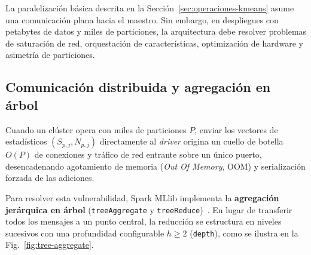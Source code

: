 \documentclass[conference,a4paper]{IEEEtran}
\begin{document}
La paralelización básica descrita en la Sección~\ref{sec:operaciones-kmeans} asume una comunicación plana hacia el maestro. Sin embargo, en despliegues con petabytes de datos y miles de particiones, la arquitectura debe resolver problemas de saturación de red, orquestación de características, optimización de hardware y asimetría de particiones.

\subsection{Comunicación distribuida y agregación en árbol}

Cuando un clúster opera con miles de particiones $P$, enviar los vectores de estadísticos $(S_{p,j}, N_{p,j})$ directamente al \textit{driver} origina un cuello de botella $O(P)$ de conexiones y tráfico de red entrante sobre un único puerto, desencadenando agotamiento de memoria (\textit{Out Of Memory}, OOM) y serialización forzada de las adiciones.

Para resolver esta vulnerabilidad, Spark MLlib implementa la \textbf{agregación jerárquica en árbol} (\texttt{treeAggregate} y \texttt{treeReduce})~\cite{meng2016mllib}. En lugar de transferir todos los mensajes a un punto central, la reducción se estructura en niveles sucesivos con una profundidad configurable $h \ge 2$ (\texttt{depth}), como se ilustra en la Fig.~\ref{fig:tree-aggregate}.
\end{document}

